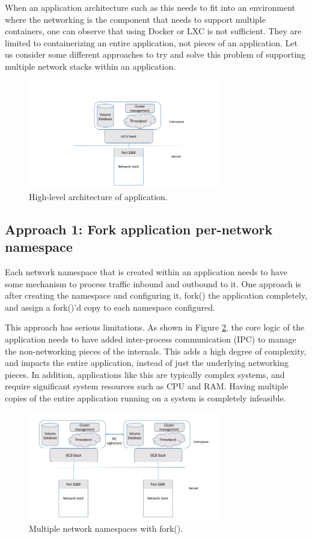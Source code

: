 \documentclass[letterpaper]{article}
\begin{document}
When an application architecture such as this needs to fit into an environment where the networking is the component that needs to support multiple containers, one can observe that using Docker or LXC is not sufficient. They are limited to containerizing an entire application, not pieces of an application. Let us consider some different approaches to try and solve this problem of supporting multiple network stacks within an application.

\begin{figure}[h]
\includegraphics[width=3.31in]{standard-app-overview.png}
\caption{High-level architecture of application.}
\label{app-overview}
\end{figure}

\subsection{Approach 1: Fork application per-network namespace}
Each network namespace that is created within an application needs to have some mechanism to process traffic inbound and outbound to it. One approach is after creating the namespace and configuring it, fork() the application completely, and assign a fork()'d copy to each namespace configured.

This approach has serious limitations. As shown in Figure \ref{namespace-fork}, the core logic of the application needs to have added inter-process communication (IPC) to manage the non-networking pieces of the internals. This adds a high degree of complexity, and impacts the entire application, instead of just the underlying networking pieces. In addition, applications like this are typically complex systems, and require significant system resources such as CPU and RAM. Having multiple copies of the entire application running on a system is completely infeasible.

\begin{figure}[h]
\includegraphics[width=3.31in]{multiple-stacks-no-namespace.png}
\caption{Multiple network namespaces with fork().}
\label{namespace-fork}
\end{figure}
\end{document}
